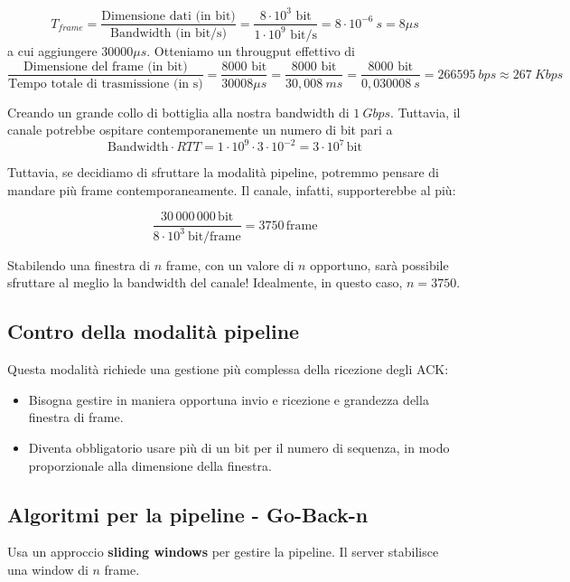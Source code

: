 $$
T_{frame} = \frac{\text{Dimensione dati (in bit)}}{\text{Bandwidth (in bit/s)}} = \frac{8\cdot 10^3 \text{ bit}}{1\cdot10^9 \text{ bit/s}}= 8\cdot 10^{-6} \ s = 8 \mu s
$$
a cui aggiungere $30000 \mu s$. Otteniamo un througput effettivo di
$$
\frac{\text{Dimensione del frame (in bit)}}{\text{Tempo totale di trasmissione (in s)}} = \frac{8000 \text{ bit}}{30008 \mu s} = \frac{8000 \text{ bit}}{30,008 \ ms} = \frac{8000 \text{ bit}}{0,030008 \ s} = 266595 \ bps \approx 267 \ Kbps
$$

Creando un grande collo di bottiglia alla nostra bandwidth di $1 \ Gbps$. Tuttavia, il canale potrebbe ospitare contemporanemente un numero di bit pari a 
$$
\text{Bandwidth} \cdot RTT = 1\cdot 10^9 \cdot 3\cdot 10^{-2} = 3 \cdot 10 ^7 \, \text{bit}
$$

Tuttavia, se decidiamo di sfruttare la modalità pipeline, potremmo pensare di mandare più frame contemporaneamente. Il canale, infatti, supporterebbe al più:

$$
\frac{30\,000\,000 \, \text{bit}}{8\cdot 10^3 \ \text{bit/frame}} = 3750 \, \text{frame}
$$

Stabilendo una finestra di $n$ frame, con un valore di $n$ opportuno, sarà possibile sfruttare al meglio la bandwidth del canale! Idealmente, in questo caso, $n=3750$.

\subsection{Contro della modalità pipeline}
Questa modalità richiede una gestione più complessa della ricezione degli ACK: 
\begin{itemize}
	\item Bisogna gestire in maniera opportuna invio e ricezione e grandezza della finestra di frame.
	\item Diventa obbligatorio usare più di un bit per il numero di sequenza, in modo proporzionale alla dimensione della finestra.
\end{itemize}

\newpage


\subsection{Algoritmi per la pipeline - Go-Back-n}
Usa un approccio \textbf{sliding windows} per gestire la pipeline.
Il server stabilisce una window di $n$ frame.
